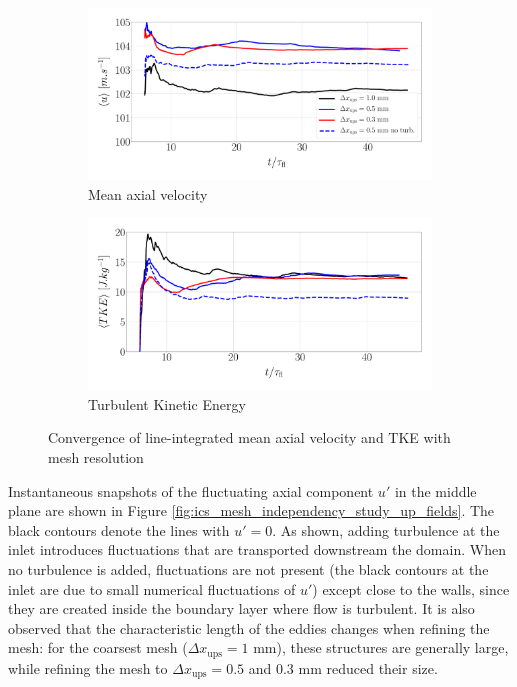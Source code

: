 \begin{figure}[ht]
\centering
\begin{subfigure}[b]{0.45\textwidth}
	\centering
   \includegraphics[scale=0.125]{./part2_developments/figures_ch5_resolved_JICF/results_ics_mesh_convergence_line_averages/U_MEAN.pdf}
   \caption{Mean axial velocity}
\end{subfigure}
\hfill
\begin{subfigure}[b]{0.45\textwidth}
	\centering
   \includegraphics[scale=0.125]{./part2_developments/figures_ch5_resolved_JICF/results_ics_mesh_convergence_line_averages/TKE.pdf}
   \caption{Turbulent Kinetic Energy}
\end{subfigure}
\caption{Convergence of line-integrated mean axial velocity and TKE with mesh resolution}
\label{fig:mesh_convergence_line_averages}
\end{figure}



Instantaneous snapshots of the fluctuating axial component $u'$ in the middle plane are shown in Figure \ref{fig:ics_mesh_independency_study_up_fields}. The black contours denote the lines with $u' = 0$. As shown, adding turbulence at the inlet introduces fluctuations that are transported downstream the domain. When no turbulence is added, fluctuations are not present (the black contours at the inlet are due to small numerical fluctuations of $u'$) except close to the walls, since they are created inside the boundary layer where flow is turbulent. It is also observed that the characteristic length of the eddies changes when refining the mesh: for the coarsest mesh ($\Delta x_\mathrm{ups} = 1$ mm), these structures are generally large, while refining the mesh to $\Delta x_\mathrm{ups} = 0.5$ and $0.3$ mm reduced their size. 

